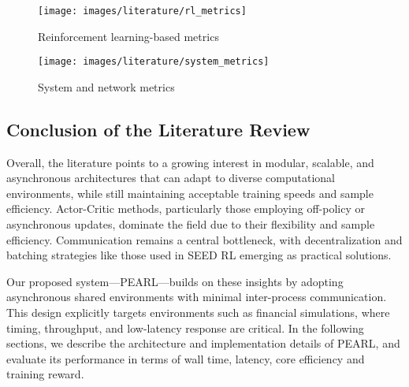 \begin{figure}[htbp]
    \centering
    \begin{minipage}[t]{0.48\textwidth}
        \centering
        \texttt{[image: images/literature/rl\_metrics]}
        \caption{Reinforcement learning-based metrics}
        \label{fig:rl_metrics}
    \end{minipage}
    \hfill
    \begin{minipage}[t]{0.48\textwidth}
        \centering
        \texttt{[image: images/literature/system\_metrics]}
        \caption{System and network metrics}
        \label{fig:system_metrics}
    \end{minipage}
\end{figure}

\subsection{Conclusion of the Literature Review}

Overall, the literature points to a growing interest in modular, scalable, and asynchronous architectures that can adapt to diverse computational environments,
while still maintaining acceptable training speeds and sample efficiency.
Actor-Critic methods, particularly those employing off-policy or asynchronous updates, dominate the field due to their flexibility and sample efficiency.
Communication remains a central bottleneck, with decentralization and batching strategies like those used in SEED RL emerging as practical solutions.

Our proposed system—PEARL—builds on these insights by adopting asynchronous shared environments with minimal inter-process communication.
This design explicitly targets environments such as financial simulations, where timing, throughput,
and low-latency response are critical.
In the following sections, we describe the architecture and implementation details of PEARL,
and evaluate its performance in terms of wall time, latency, core efficiency and training reward.